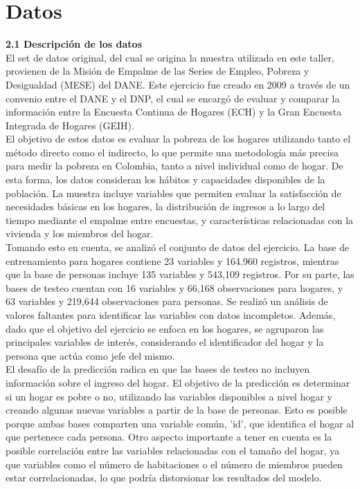 \documentclass[a4paper]{article}
\theoremstyle{remark}
\theoremstyle{definition}
\begin{document}
\section{Datos}

\textbf{2.1 Descripción de los datos} \\


El set de datos original, del cual se origina la muestra utilizada en este taller, provienen de la Misión de Empalme de las Series de Empleo, Pobreza y Desigualdad (MESE) del DANE. Este ejercicio fue creado en 2009 a través de un convenio entre el DANE y el DNP, el cual se encargó de evaluar y comparar la información entre la Encuesta Continua de Hogares (ECH) y la Gran Encuesta Integrada de Hogares (GEIH). \\

El objetivo de estos datos es evaluar la pobreza de los hogares utilizando tanto el método directo como el indirecto, lo que permite una metodología más precisa para medir la pobreza en Colombia, tanto a nivel individual como de hogar. De esta forma, los datos consideran los hábitos y capacidades disponibles de la población. La muestra incluye variables que permiten evaluar la satisfacción de necesidades básicas en los hogares, la distribución de ingresos a lo largo del tiempo mediante el empalme entre encuestas, y características relacionadas con la vivienda y los miembros del hogar. \\

Tomando esto en cuenta, se analizó el conjunto de datos del ejercicio. La base de entrenamiento para hogares contiene 23 variables y 164.960 registros, mientras que la base de personas incluye 135 variables y 543,109 registros. Por su parte, las bases de testeo cuentan con 16 variables y 66,168 observaciones para hogares, y 63 variables y 219,644 observaciones para personas. Se realizó un análisis de valores faltantes para identificar las variables con datos incompletos. Además, dado que el objetivo del ejercicio se enfoca en los hogares, se agruparon las principales variables de interés, considerando el identificador del hogar y la persona que actúa como jefe del mismo.\\

El desafío de la predicción radica en que las bases de testeo no incluyen información sobre el ingreso del hogar. El objetivo de la predicción es determinar si un hogar es pobre o no, utilizando las variables disponibles a nivel hogar y creando algunas nuevas variables a partir de la base de personas. Esto es posible porque ambas bases comparten una variable común, 'id', que identifica el hogar al que pertenece cada persona. Otro aspecto importante a tener en cuenta es la posible correlación entre las variables relacionadas con el tamaño del hogar, ya que variables como el número de habitaciones o el número de miembros pueden estar correlacionadas, lo que podría distorsionar los resultados del modelo.\\
\end{document}
